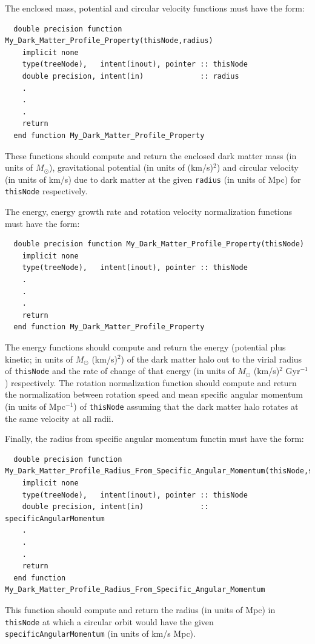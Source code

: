 The enclosed mass, potential and circular velocity functions must have the form:
\begin{verbatim}
  double precision function My_Dark_Matter_Profile_Property(thisNode,radius)
    implicit none
    type(treeNode),   intent(inout), pointer :: thisNode
    double precision, intent(in)             :: radius
    .
    .
    .
    return
  end function My_Dark_Matter_Profile_Property
\end{verbatim}
These functions should compute and return the enclosed dark matter mass (in units of $M_\odot$), gravitational potential (in units of (km/s)$^2$) and circular velocity (in units of km/s) due to dark matter at the given {\tt radius} (in units of Mpc) for {\tt thisNode} respectively.

The energy, energy growth rate and rotation velocity normalization functions must have the form:
\begin{verbatim}
  double precision function My_Dark_Matter_Profile_Property(thisNode)
    implicit none
    type(treeNode),   intent(inout), pointer :: thisNode
    .
    .
    .
    return
  end function My_Dark_Matter_Profile_Property
\end{verbatim}
The energy functions should compute and return the energy (potential plus kinetic; in units of $M_\odot$ (km/s)$^2$) of the dark matter halo out to the virial radius of {\tt thisNode} and the rate of change of that energy (in units of $M_\odot$ (km/s)$^2$ Gyr$^{-1}$) respectively. The rotation normalization function should compute and return the normalization between rotation speed and mean specific angular momentum (in units of Mpc$^{-1}$) of {\tt thisNode} assuming that the dark matter halo rotates at the same velocity at all radii.

Finally, the radius from specific angular momentum functin must have the form:
\begin{verbatim}
  double precision function My_Dark_Matter_Profile_Radius_From_Specific_Angular_Momentum(thisNode,specificAngularMomentum)
    implicit none
    type(treeNode),   intent(inout), pointer :: thisNode
    double precision, intent(in)             :: specificAngularMomentum
    .
    .
    .
    return
  end function My_Dark_Matter_Profile_Radius_From_Specific_Angular_Momentum
\end{verbatim}
This function should compute and return the radius (in units of Mpc) in {\tt thisNode} at which a circular orbit would have the given {\tt specificAngularMomentum} (in units of km/s Mpc).

